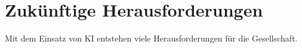 \newpage
\section{Zukünftige Herausforderungen}\label{Herausforderungen}

Mit dem Einsatz von \ac{KI} entstehen viele Herausforderungen für die Gesellschaft. 